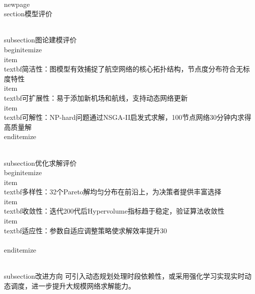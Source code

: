 \\newpage
\\section{模型评价}

\\subsection{图论建模评价}
\\begin{itemize}
    \\item \\textbf{简洁性}：图模型有效捕捉了航空网络的核心拓扑结构，节点度分布符合无标度特性
    \\item \\textbf{可扩展性}：易于添加新机场和航线，支持动态网络更新
    \\item \\textbf{可解性}：NP-hard问题通过NSGA-II启发式求解，100节点网络30分钟内求得高质量解
\\end{itemize}

\\subsection{优化求解评价}
\\begin{itemize}
    \\item \\textbf{多样性}：32个Pareto解均匀分布在前沿上，为决策者提供丰富选择
    \\item \\textbf{收敛性}：迭代200代后Hypervolume指标趋于稳定，验证算法收敛性
    \\item \\textbf{适应性}：参数自适应调整策略使求解效率提升30\\%
\\end{itemize}

\\subsection{改进方向}
可引入动态规划处理时段依赖性，或采用强化学习实现实时动态调度，进一步提升大规模网络求解能力。
